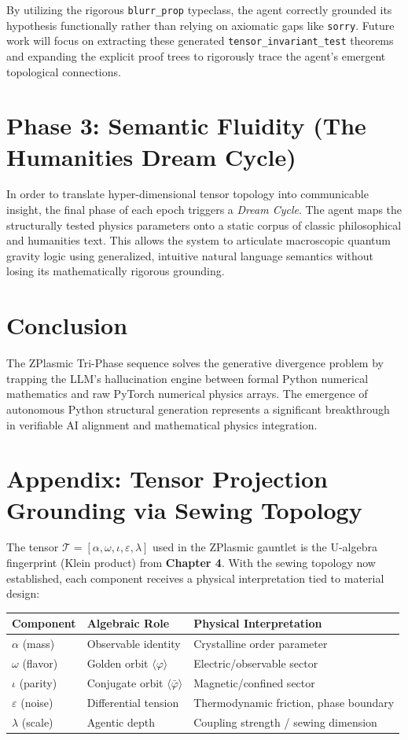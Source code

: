 \documentclass[11pt,a4paper]{article}
\begin{document}
By utilizing the rigorous \texttt{blurr\_prop} typeclass, the agent correctly grounded its hypothesis functionally rather than relying on axiomatic gaps like \texttt{sorry}. Future work will focus on extracting these generated \texttt{tensor\_invariant\_test} theorems and expanding the explicit proof trees to rigorously trace the agent's emergent topological connections.

\section{Phase 3: Semantic Fluidity (The Humanities Dream Cycle)}
In order to translate hyper-dimensional tensor topology into communicable insight, the final phase of each epoch triggers a \textit{Dream Cycle}. The agent maps the structurally tested physics parameters onto a static corpus of classic philosophical and humanities text. This allows the system to articulate macroscopic quantum gravity logic using generalized, intuitive natural language semantics without losing its mathematically rigorous grounding.

\section{Conclusion}
The ZPlasmic Tri-Phase sequence solves the generative divergence problem by trapping the LLM's hallucination engine between formal Python numerical mathematics and raw PyTorch numerical physics arrays. The emergence of autonomous Python structural generation represents a significant breakthrough in verifiable AI alignment and mathematical physics integration.

\section{Appendix: Tensor Projection Grounding via Sewing Topology}

The tensor $\mathcal{T} = [\alpha, \omega, \iota, \varepsilon, \lambda]$ used in the ZPlasmic gauntlet is the U-algebra fingerprint (Klein product) from \textbf{Chapter 4}. With the sewing topology now established, each component receives a physical interpretation tied to material design:

\begin{center}
\begin{tabular}{@{}lll@{}}
\hline
\textbf{Component} & \textbf{Algebraic Role} & \textbf{Physical Interpretation} \\
\hline
$\alpha$ (mass) & Observable identity & Crystalline order parameter \\
$\omega$ (flavor) & Golden orbit $\langle\varphi\rangle$ & Electric/observable sector \\
$\iota$ (parity) & Conjugate orbit $\langle\bar\varphi\rangle$ & Magnetic/confined sector \\
$\varepsilon$ (noise) & Differential tension & Thermodynamic friction, phase boundary \\
$\lambda$ (scale) & Agentic depth & Coupling strength / sewing dimension \\
\hline
\end{tabular}
\end{center}
\end{document}
